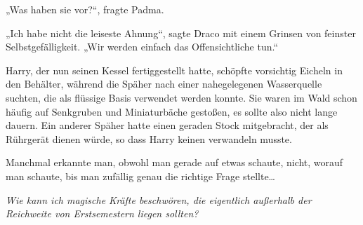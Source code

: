 „Was haben sie vor?“, fragte Padma.

„Ich habe nicht die leiseste Ahnung“, sagte Draco mit einem Grinsen von feinster Selbstgefälligkeit. „Wir werden einfach das Offensichtliche tun.“

\later

Harry, der nun seinen Kessel fertiggestellt hatte, schöpfte vorsichtig Eicheln in den Behälter, während die Späher nach einer nahegelegenen Wasserquelle suchten, die als flüssige Basis verwendet werden konnte. Sie waren im Wald schon häufig auf Senkgruben und Miniaturbäche gestoßen, es sollte also nicht lange dauern. Ein anderer Späher hatte einen geraden Stock mitgebracht, der als Rührgerät dienen würde, so dass Harry keinen verwandeln musste.

Manchmal erkannte man, obwohl man gerade auf etwas schaute, nicht, worauf man schaute, bis man zufällig genau die richtige Frage stellte…

\emph{Wie kann ich magische Kräfte beschwören, die eigentlich außerhalb der Reichweite von Erstsemestern liegen sollten?}

